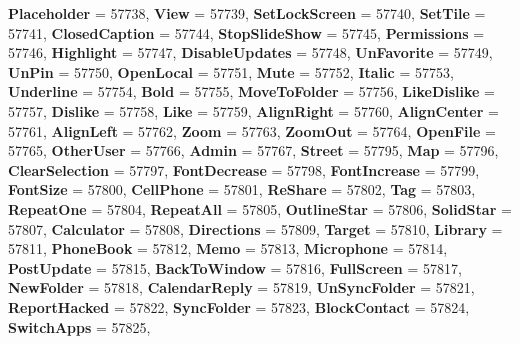 \begin{DoxyCompactItemize}
{\bfseries Placeholder} = 57738, 
{\bfseries View} = 57739, 
{\bfseries Set\+Lock\+Screen} = 57740, 
{\bfseries Set\+Tile} = 57741, 
\newline
{\bfseries Closed\+Caption} = 57744, 
{\bfseries Stop\+Slide\+Show} = 57745, 
{\bfseries Permissions} = 57746, 
{\bfseries Highlight} = 57747, 
\newline
{\bfseries Disable\+Updates} = 57748, 
{\bfseries Un\+Favorite} = 57749, 
{\bfseries Un\+Pin} = 57750, 
{\bfseries Open\+Local} = 57751, 
\newline
{\bfseries Mute} = 57752, 
{\bfseries Italic} = 57753, 
{\bfseries Underline} = 57754, 
{\bfseries Bold} = 57755, 
\newline
{\bfseries Move\+To\+Folder} = 57756, 
{\bfseries Like\+Dislike} = 57757, 
{\bfseries Dislike} = 57758, 
{\bfseries Like} = 57759, 
\newline
{\bfseries Align\+Right} = 57760, 
{\bfseries Align\+Center} = 57761, 
{\bfseries Align\+Left} = 57762, 
{\bfseries Zoom} = 57763, 
\newline
{\bfseries Zoom\+Out} = 57764, 
{\bfseries Open\+File} = 57765, 
{\bfseries Other\+User} = 57766, 
{\bfseries Admin} = 57767, 
\newline
{\bfseries Street} = 57795, 
{\bfseries Map} = 57796, 
{\bfseries Clear\+Selection} = 57797, 
{\bfseries Font\+Decrease} = 57798, 
\newline
{\bfseries Font\+Increase} = 57799, 
{\bfseries Font\+Size} = 57800, 
{\bfseries Cell\+Phone} = 57801, 
{\bfseries Re\+Share} = 57802, 
\newline
{\bfseries Tag} = 57803, 
{\bfseries Repeat\+One} = 57804, 
{\bfseries Repeat\+All} = 57805, 
{\bfseries Outline\+Star} = 57806, 
\newline
{\bfseries Solid\+Star} = 57807, 
{\bfseries Calculator} = 57808, 
{\bfseries Directions} = 57809, 
{\bfseries Target} = 57810, 
\newline
{\bfseries Library} = 57811, 
{\bfseries Phone\+Book} = 57812, 
{\bfseries Memo} = 57813, 
{\bfseries Microphone} = 57814, 
\newline
{\bfseries Post\+Update} = 57815, 
{\bfseries Back\+To\+Window} = 57816, 
{\bfseries Full\+Screen} = 57817, 
{\bfseries New\+Folder} = 57818, 
\newline
{\bfseries Calendar\+Reply} = 57819, 
{\bfseries Un\+Sync\+Folder} = 57821, 
{\bfseries Report\+Hacked} = 57822, 
{\bfseries Sync\+Folder} = 57823, 
\newline
{\bfseries Block\+Contact} = 57824, 
{\bfseries Switch\+Apps} = 57825, 

\end{DoxyCompactItemize}
